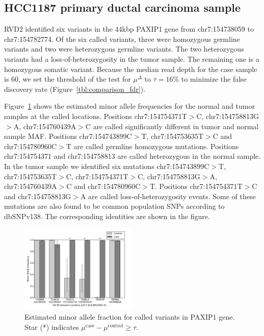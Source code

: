 \documentclass{bioinfo}
\begin{document}
\subsection{HCC1187 primary ductal carcinoma sample}\label{sec:brca}

RVD2 identified six variants in the 44kbp PAXIP1 gene from chr7:154738059 to chr7:154782774. Of the six called variants, three were homozygous germline variants and two were heterozygous germline variants. The two heterozygous variants had a loss-of-heterozygosity in the tumor sample. The remaining one is a homozygous somatic variant. Because the median read depth for the case sample is 60, we set the threshold of the test for $\mu^\Delta$ to $\tau = 16\%$ to minimize the false discovery rate (Figure~\ref{tbl:comparison_fdr}). 

Figure~\ref{fig:brca_MAF} shows the estimated minor allele frequencies for the normal and tumor samples at the called locations. Positions chr7:154754371T$>$C, chr7:154758813G$>$A, chr7:154760439A$>$C are called significantly different in tumor and normal sample MAF. Positions chr7:154743899C$>$T, chr7:154753635T$>$C and chr7:154780960C$>$T are called germline homozygous mutations. Positions chr7:154754371 and chr7:154758813 are called heterozygous in the normal sample. In the tumor sample we identified six mutations chr7:154743899C$>$T, chr7:154753635T$>$C, chr7:154754371T$>$C, chr7:154758813G$>$A, chr7:154760439A$>$C and chr7:154780960C$>$T. Positions chr7:154754371T$>$C and chr7:154758813G$>$A are called loss-of-heterozygosity events. Some of these mutations are also found to be common population SNPs according to dbSNPv138. The corresponding identities are shown in the figure.


\begin{figure}[h]
\begin{center}
\includegraphics[width=0.5\textwidth]{pdf_figs/HCC1187_MuBarPlot.pdf}
\caption{Estimated minor allele fraction for called variants in PAXIP1 gene. Star (*) indicates $\mu^{\text{case}} - \mu^{\text{control}} \geq \tau$.}
\label{fig:brca_MAF}
\end{center}
\end{figure}
\end{document}
